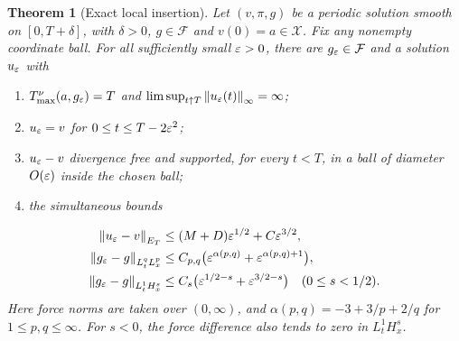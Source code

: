 \documentclass[11pt,a4paper]{article}
\newtheorem{theorem}{Theorem}[section]
\theoremstyle{definition}\newtheorem{definition}[theorem]{Definition}
\theoremstyle{remark}\newtheorem{remark}[theorem]{Remark}
\newcommand{\FF}{\mathcal F}\newcommand{\XX}{\mathcal X}
\newcommand{\norm}[1]{\left\lVert#1\right\rVert}
\begin{document}
\begin{theorem}[Exact local insertion]\label{thm:insertion}
Let $(v,\pi,g)$ be a periodic solution smooth on $[0,T+\delta]$, with
$\delta>0$, $g\in\FF$ and $v(0)=a\in\XX$. Fix any nonempty coordinate ball.
For all sufficiently small $\varepsilon>0$, there are $g_\eps\in\FF$ and a solution $u_\varepsilon$ with
\begin{enumerate}[label=(\roman*),nosep]
\item $T_{\max}^{\nu}(a,g_\varepsilon)=T$ and
$\limsup_{t\uparrow T}\norm{u_\eps(t)}_\infty=\infty$;
\item $u_\varepsilon=v$ for $0\le t\le T-2\varepsilon^2$;
\item $u_\varepsilon-v$ divergence free and supported, for every $t<T$, in a ball of diameter $O(\varepsilon)$ inside the chosen ball;
\item the simultaneous bounds
\end{enumerate}
\begin{align}
 \norm{u_\eps-v}_{E_T}
   &\le (M+D)\eps^{1/2}+C\eps^{3/2},\label{eq:Eclose}\\
 \norm{g_\eps-g}_{L^q_tL^p_x}
   &\le C_{p,q}\bigl(\eps^{\alpha(p,q)}
                    +\eps^{\alpha(p,q)+1}\bigr),\label{eq:Fclose}\\
 \norm{g_\eps-g}_{L^1_tH^s_x}
   &\le C_s\bigl(\eps^{1/2-s}+\eps^{3/2-s}\bigr)
                         \quad(0\le s<1/2).\label{eq:Hsclose}
\end{align}
Here force norms are taken over $(0,\infty)$, and
$\alpha(p,q)=-3+3/p+2/q$ for $1\le p,q\le\infty$.
For $s<0$, the force difference also tends to zero in $L^1_tH^s_x$.
\end{theorem}
\end{document}
